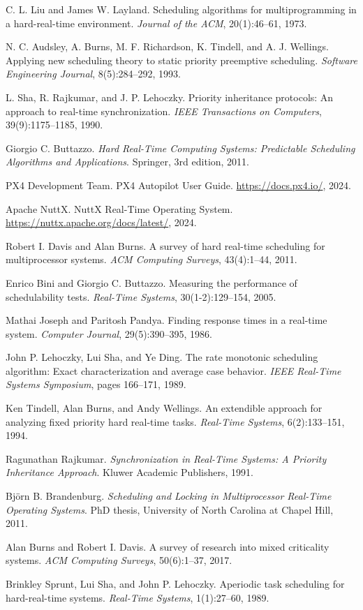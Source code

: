 \documentclass[12pt,a4paper]{article}
\begin{document}
\begin{thebibliography}{99}
 C. L. Liu and James W. Layland. Scheduling algorithms for multiprogramming in a hard-real-time environment. \textit{Journal of the ACM}, 20(1):46--61, 1973.

 N. C. Audsley, A. Burns, M. F. Richardson, K. Tindell, and A. J. Wellings. Applying new scheduling theory to static priority preemptive scheduling. \textit{Software Engineering Journal}, 8(5):284--292, 1993.

 L. Sha, R. Rajkumar, and J. P. Lehoczky. Priority inheritance protocols: An approach to real-time synchronization. \textit{IEEE Transactions on Computers}, 39(9):1175--1185, 1990.

 Giorgio C. Buttazzo. \textit{Hard Real-Time Computing Systems: Predictable Scheduling Algorithms and Applications}. Springer, 3rd edition, 2011.

 PX4 Development Team. PX4 Autopilot User Guide. \url{https://docs.px4.io/}, 2024.

 Apache NuttX. NuttX Real-Time Operating System. \url{https://nuttx.apache.org/docs/latest/}, 2024.

 Robert I. Davis and Alan Burns. A survey of hard real-time scheduling for multiprocessor systems. \textit{ACM Computing Surveys}, 43(4):1--44, 2011.

 Enrico Bini and Giorgio C. Buttazzo. Measuring the performance of schedulability tests. \textit{Real-Time Systems}, 30(1-2):129--154, 2005.

 Mathai Joseph and Paritosh Pandya. Finding response times in a real-time system. \textit{Computer Journal}, 29(5):390--395, 1986.

 John P. Lehoczky, Lui Sha, and Ye Ding. The rate monotonic scheduling algorithm: Exact characterization and average case behavior. \textit{IEEE Real-Time Systems Symposium}, pages 166--171, 1989.

 Ken Tindell, Alan Burns, and Andy Wellings. An extendible approach for analyzing fixed priority hard real-time tasks. \textit{Real-Time Systems}, 6(2):133--151, 1994.

 Ragunathan Rajkumar. \textit{Synchronization in Real-Time Systems: A Priority Inheritance Approach}. Kluwer Academic Publishers, 1991.

 Björn B. Brandenburg. \textit{Scheduling and Locking in Multiprocessor Real-Time Operating Systems}. PhD thesis, University of North Carolina at Chapel Hill, 2011.

 Alan Burns and Robert I. Davis. A survey of research into mixed criticality systems. \textit{ACM Computing Surveys}, 50(6):1--37, 2017.

 Brinkley Sprunt, Lui Sha, and John P. Lehoczky. Aperiodic task scheduling for hard-real-time systems. \textit{Real-Time Systems}, 1(1):27--60, 1989.
\end{thebibliography}
\end{document}
